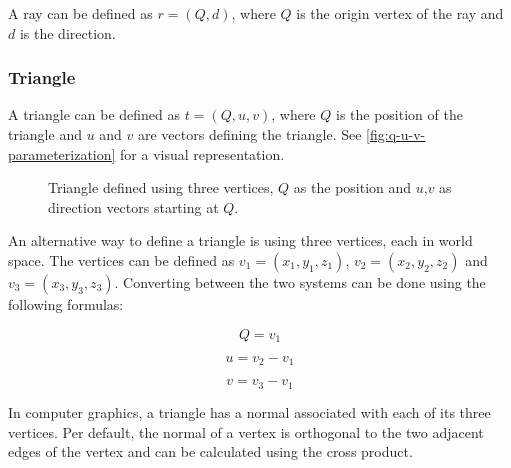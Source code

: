 A ray can be defined as $r = (Q, d)$, where $Q$ is the origin vertex of the ray and $d$ is the direction.

\subsubsection{Triangle}

A triangle can be defined as $t = (Q, u, v)$, where $Q$ is the position of the triangle and $u$ and $v$ are vectors defining the triangle. See \autoref{fig:q-u-v-parameterization} for a visual representation.

\begin{figure}[H]
  \centering
  \caption{Triangle defined using three vertices, $Q$ as the position and $u$,$v$ as direction vectors starting at $Q$.}
  \label{fig:q-u-v-parameterization}
\end{figure}

An alternative way to define a triangle is using three vertices, each in world space. The vertices can be defined as $v_1 = (x_1, y_1, z_1)$, $v_2 = (x_2, y_2, z_2)$ and $v_3 = (x_3, y_3, z_3)$. Converting between the two systems can be done using the following formulas:

\begin{equation}
  \label{eqn:triangle-vertices-to-q-u-v}
  Q = v_1
\end{equation}

\begin{equation}
  \label{eqn:triangle-vertices-to-q-u-v1}
  u = v_2 - v_1
\end{equation}

\begin{equation}
  \label{eqn:triangle-vertices-to-q-u-v2}
  v = v_3 - v_1
\end{equation}

In computer graphics, a triangle has a normal associated with each of its three vertices. Per default, the normal of a vertex is orthogonal to the two adjacent edges of the vertex and can be calculated using the cross product.

